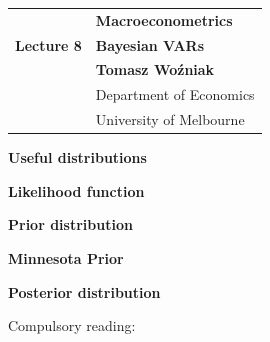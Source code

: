 \documentclass[notes,blackandwhite,mathsans,usenames,dvipsnames]{beamer}
\begin{document}






{
\begin{frame}

\vspace{1cm}
\begin{tabular}{rl}
&\textbf{\LARGE\color{purple} Macroeconometrics}\\[8ex]
\textbf{\Large Lecture 8}&\textbf{\Large\color{mcxs4}Bayesian VARs}\\[19ex]
&\textbf{Tomasz Wo\'zniak}\\[1ex]
&{\small\color{mcxs4} Department of Economics}\\
&{\small\color{mcxs4}University of Melbourne}
\end{tabular}

\end{frame}
}



{
\begin{frame}

\vspace{1cm}\textbf{\color{mcxs4}Useful distributions}

\bigskip\textbf{\color{mcxs4}Likelihood function}

\bigskip\textbf{\color{mcxs4}Prior distribution}

\bigskip\textbf{\color{mcxs1}Minnesota Prior}

\bigskip\textbf{\color{mcxs4}Posterior distribution}

\small
\vspace{1cm}Compulsory reading: \\ 

\end{frame}
}
\end{document}
